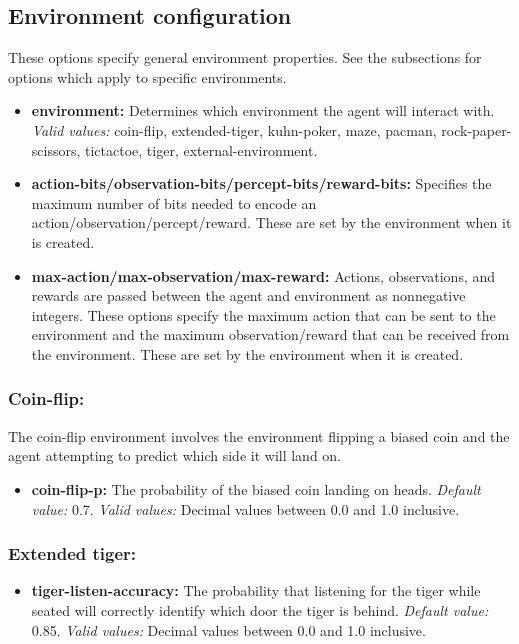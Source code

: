 \documentclass[a4paper,11pt]{article}
\begin{document}
\subsection{Environment configuration}
These options specify general environment properties. See the subsections for options which apply to specific environments.
\begin{itemize}
\item {\bf environment:} Determines which environment the agent will interact with. {\em Valid values:} coin-flip, extended-tiger, kuhn-poker, maze, pacman, rock-paper-scissors, tictactoe, tiger, external-environment.

\item {\bf action-bits/observation-bits/percept-bits/reward-bits:} Specifies the maximum number of bits needed to encode an action/observation/percept/reward. These are set by the environment when it is created.

\item {\bf max-action/max-observation/max-reward:} Actions, observations, and rewards are passed between the agent and environment as nonnegative integers. These options specify the maximum action that can be sent to the environment and the maximum observation/reward that can be received from the environment. These are set by the environment when it is created.
\end{itemize}


\subsubsection{Coin-flip:}
The coin-flip environment involves the environment flipping a biased coin and the agent attempting to predict which side it will land on.
\begin{itemize}
\item {\bf coin-flip-p:} The probability of the biased coin landing on heads. {\em Default value:} 0.7. {\em Valid values:} Decimal values between 0.0 and 1.0 inclusive.
\end{itemize}

\subsubsection{Extended tiger:}
\begin{itemize}
\item {\bf tiger-listen-accuracy:} The probability that listening for the tiger while seated will correctly identify which door the tiger is behind. {\em Default value:} 0.85. {\em Valid values:} Decimal values between 0.0 and 1.0 inclusive.
\end{itemize}
\end{document}
